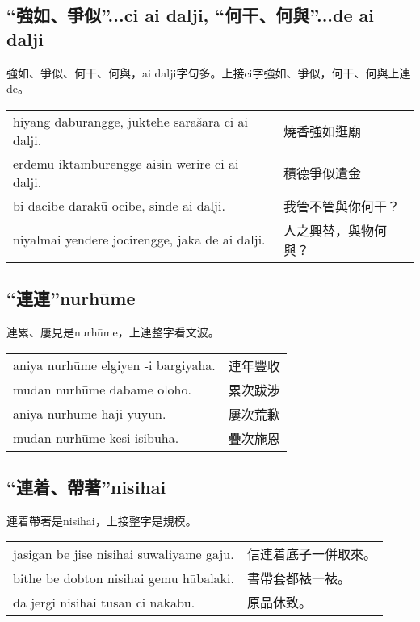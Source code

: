 \documentclass{article}
\begin{document}
\subsection{“強如、爭似”...ci ai dalji, “何干、何與”...de ai dalji}
\noindent 強如、爭似、何干、何與，ai dalji字句多。上接ci字強如、爭似，何干、何與上連de。
\begin{center}
    \begin{tabularx}{\textwidth}{XX}
        hiyang daburangge, juktehe sara\v{s}ara ci ai dalji. & 燒香強如逛廟\\
        erdemu iktamburengge aisin werire ci ai dalji. & 積德爭似遺金\\
        bi dacibe darak\={u} ocibe, sinde ai dalji. & 我管不管與你何干？\\
        niyalmai yendere jocirengge, jaka de ai dalji. & 人之興替，與物何與？
    \end{tabularx}
\end{center}

\subsection{“連連”nurh\={u}me}
\noindent 連累、屢見是nurh\={u}me，上連整字看文波。
\begin{center}
    \begin{tabularx}{\textwidth}{XX}
        aniya nurh\={u}me elgiyen -i bargiyaha. & 連年豐收\\
        mudan nurh\={u}me dabame oloho. & 累次跋涉\\
        aniya nurh\={u}me haji yuyun. & 屢次荒歉\\
        mudan nurh\={u}me kesi isibuha. & 疊次施恩
    \end{tabularx}
\end{center}

\subsection{“連着、帶著”nisihai}
\noindent 連着帶著是nisihai，上接整字是規模。
\begin{center}
    \begin{tabularx}{\textwidth}{XX}
        jasigan be jise nisihai suwaliyame gaju. & 信連着底子一併取來。\\
        bithe be dobton nisihai gemu h\={u}balaki. & 書帶套都裱一裱。\\
        da jergi nisihai tusan ci nakabu. & 原品休致。
    \end{tabularx}
\end{center}
\end{document}
